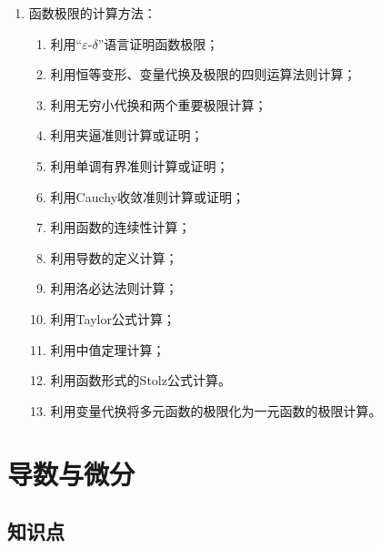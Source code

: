 \documentclass[UTF8]{ctexart}
\theoremstyle{remark}
\begin{document}
\begin{enumerate}
				\item 函数极限的计算方法：
				\begin{enumerate}
					\item 利用“$\varepsilon$-$\delta$”语言证明函数极限；
					\item 利用恒等变形、变量代换及极限的四则运算法则计算；
					\item 利用无穷小代换和两个重要极限计算；
					\item 利用夹逼准则计算或证明；
					\item 利用单调有界准则计算或证明；
					\item 利用Cauchy收敛准则计算或证明；
					\item 利用函数的连续性计算；
					\item 利用导数的定义计算；
					\item 利用洛必达法则计算；
					\item 利用Taylor公式计算；
					\item 利用中值定理计算；
					\item 利用函数形式的Stolz公式计算。
					\item 利用变量代换将多元函数的极限化为一元函数的极限计算。
				\end{enumerate}
			\end{enumerate}
			
			
			\section{导数与微分}
			
			\subsection*{知识点}
			
\end{document}
